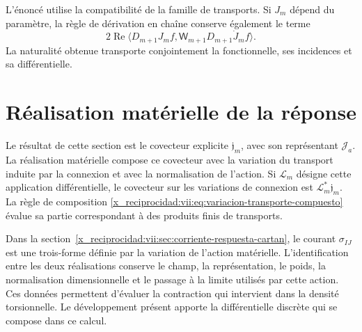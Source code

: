 L'énoncé utilise la compatibilité de la famille de transports. Si \(J_m\) dépend du paramètre, la règle de dérivation en chaîne conserve également le terme
\[
 2\operatorname{Re}
 \langle D_{m+1}J_mf,\mathsf W_{m+1}D_{m+1}\dot J_mf\rangle.
\]
La naturalité obtenue transporte conjointement la fonctionnelle, ses
incidences et sa différentielle.

\section{Réalisation matérielle de la réponse}
\label{x_reciprocidad:vii:subsec:realizacion-respuesta-discreta}

Le résultat de cette section est le covecteur explicite
\(\mathfrak j_m\), avec son représentant \(\mathcal J_a\).
La réalisation matérielle compose ce covecteur avec la variation du
transport induite par la connexion et avec la normalisation de l'action.
Si \(\mathcal L_m\) désigne cette application différentielle, le covecteur sur
les variations de connexion est \(\mathcal L_m^*\mathfrak j_m\).
La règle de composition
\eqref{x_reciprocidad:vii:eq:variacion-transporte-compuesto} évalue sa partie
correspondant à des produits finis de transports.

Dans la section~\ref{x_reciprocidad:vii:sec:corriente-respuesta-cartan}, le courant
\(\sigma_{IJ}\) est une trois-forme définie par la variation de l'action
matérielle. L'identification entre les deux réalisations conserve le champ,
la représentation, le poids, la normalisation dimensionnelle et le passage à la
limite utilisés par cette action. Ces données permettent d'évaluer la
contraction qui intervient dans la densité torsionnelle. Le développement
présent apporte la différentielle discrète qui se compose dans ce calcul.




